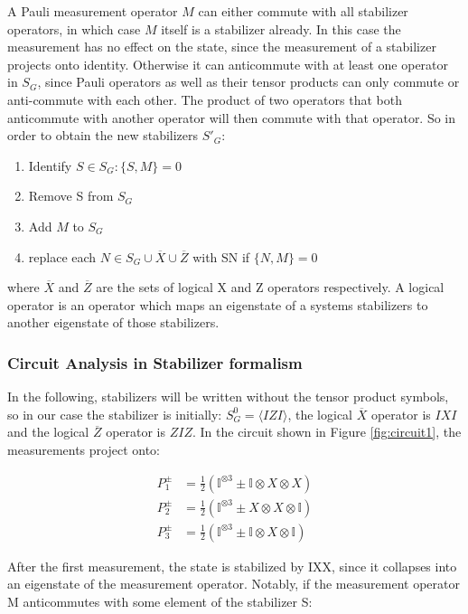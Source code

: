 A Pauli measurement operator $M$ can either commute with all stabilizer
operators, in which case $M$ itself is a stabilizer already. In this case
the measurement has no effect on the state, since the measurement of a
stabilizer projects onto identity.
Otherwise it can anticommute with at
least one operator in $S_{G}$, since Pauli operators as well as
their tensor products can only commute or anti-commute with each
other. The product of two operators that both anticommute with another operator
will then commute with that operator.
So in order to obtain the new stabilizers  $S'_{G}$:
\begin{enumerate}
	\item Identify $S\in S_{G}: \{S,M\}=0$
	\item Remove S from $S_G$
	\item Add $M$ to $S_G$ 
	\item replace each $N \in S_G \cup\overline{X}\cup\overline{Z}$
		with SN if $\{N,M\}=0$
\end{enumerate}
where $\overline{X}$ and $\overline{Z}$ are the sets of 
logical X and Z operators respectively. A logical operator is
an operator which maps an eigenstate of a systems stabilizers
to another eigenstate of those stabilizers.

\subsubsection{Circuit Analysis in Stabilizer formalism}

In the following, stabilizers
will be written without the tensor product symbols, so in 
our case the stabilizer is initially: $S_{G}^{0}= \langle IZI \rangle$,
the logical $\overline{X}$ operator is $IXI$ and the logical
$\overline{Z}$ operator is $ZIZ$.
In the circuit shown in 
Figure \ref{fig:circuit1}, the measurements project onto:

\begin{align}
	P^{\pm}_{1} &= \frac{1}{2}\left(\mathbb{I}^{\otimes 3} \pm 
	\mathbb{I}\otimes X \otimes X\right) \\
	P^{\pm}_{2} & = \frac{1}{2} \left(\mathbb{I}^{\otimes 3} \pm
	X \otimes X \otimes \mathbb{I}\right) \\
	P^{\pm}_{3} &= \frac{1}{2} \left(\mathbb{I}^{\otimes 3} \pm
	\mathbb{I} \otimes X \otimes \mathbb{I}\right)
\end{align}

After the first measurement, the state is stabilized by 
IXX, since it collapses into an eigenstate of the measurement 
operator. Notably, if the measurement operator M anticommutes
with some element of the stabilizer S:

